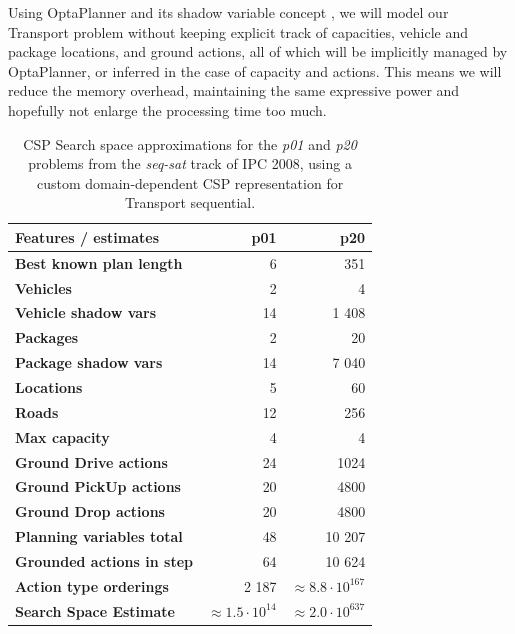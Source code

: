 Using OptaPlanner and its shadow variable concept \citep[Section~4.3.6]{DeSmet2017}, we will model our Transport problem without keeping explicit track of capacities,
vehicle and package locations, and ground actions, all of which will be implicitly managed by OptaPlanner, or inferred in the case of capacity and actions.
This means we will reduce the memory overhead, maintaining the same expressive power
and hopefully not enlarge the processing time too much.


\begin{table}[tb]
\begin{center}
\begin{tabular}{l||rr}
\textbf{Features / estimates} & \textbf{p01} & \textbf{p20} \\ 
\midrule
\midrule
\textbf{Best known plan length} & 6 & 351 \\ 
\textbf{Vehicles} & 2 & 4 \\ 
\textbf{Vehicle shadow vars} & 14 & 1 408 \\
\textbf{Packages} & 2 & 20 \\ 
\textbf{Package shadow vars} & 14 & 7 040 \\
\textbf{Locations} & 5 & 60 \\
\textbf{Roads} & 12 & 256 \\
\textbf{Max capacity} & 4 & 4 \\ 
\midrule
\textbf{Ground Drive actions} & 24 & 1024 \\ 
\textbf{Ground PickUp actions} & 20 & 4800 \\ 
\textbf{Ground Drop actions} & 20 & 4800 \\ 
\midrule
\textbf{Planning variables total} & 48 & 10 207 \\ 
\textbf{Grounded actions in step} & 64 & 10 624 \\ 
\textbf{Action type orderings} & 2 187 & $\approx 8.8 \cdot 10^{167}$ \\ 
\textbf{Search Space Estimate} & $\approx 1.5 \cdot 10^{14}$ & $\approx 2.0 \cdot 10^{637}$ \\
\end{tabular}
\end{center}
\caption[Search space approximations for a domain-dependent CSP representation.]{CSP Search space approximations for the \textit{p01} and \textit{p20} problems from the \textit{seq-sat} track of IPC 2008, using a custom domain-dependent CSP representation for Transport sequential.}
\label{tab:csp-custom}
\end{table}

